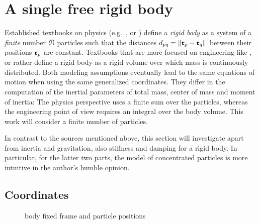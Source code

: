 \section{A single free rigid body}\label{sec:RB}
Established textbooks on physics (e.g.\ \cite[chap. 4]{Goldstein:ClassicalMechanics}, \cite[§31]{Landau:Mechanics} or \cite[§44]{Boltzmann:PrincipeDerMechanik}) define a \textit{rigid body} as a system of a \textit{finite} number $\mathfrak{N}$ particles such that the distances $d_{pq} = \| \boldsymbol{\mathfrak{r}}_{p} - \boldsymbol{\mathfrak{r}}_{q} \|_{}$ between their positions $\boldsymbol{\mathfrak{r}}_{p}$ are constant.
Textbooks that are more focused on engineering like \cite[sec.\ 8, § 1]{Hamel:TheoretischeMechanik}, \cite[sec.\ 4.1]{Bremer:ElasticMultibodyDynamics} or \cite[sec.\ 6.1.1]{Schwertassek:MultibodySystems} rather define a rigid body as a rigid volume over which mass is continuously distributed.
Both modeling assumptions eventually lead to the same equations of motion when using the same generalized coordinates.
They differ in the computation of the inertial parameters of total mass, center of mass and moment of inertia:
The physics perspective uses a finite sum over the particles, whereas the engineering point of view requires an integral over the body volume.
This work will consider a finite number of particles.

In contrast to the sources mentioned above, this section will investigate apart from inertia and gravitation, also stiffness and damping for a rigid body.
In particular, for the latter two parts, the model of concentrated particles is more intuitive in the author's humble opinion.


\subsection{Coordinates}
\begin{figure}[ht]
 \centering
 
 \caption{body fixed frame and particle positions}
 \label{fig:RigidBodyIllustration}
\end{figure}

